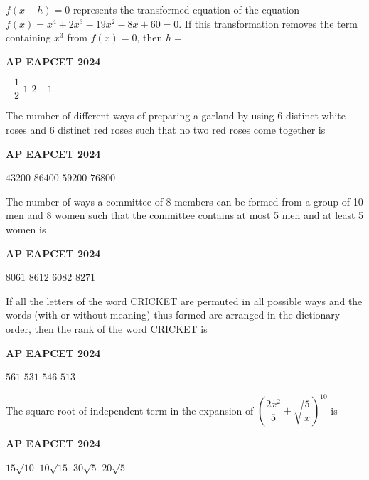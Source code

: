 \documentclass[11pt,paper=a4,answers]{exam}
\begin{document}
\begin{multicols}{2}
\begin{questions}
\question
$f(x+h)=0$ represents the transformed equation of the equation
$f(x)=x^4+2 x^3-19 x^2-8 x+60=0$. If this transformation removes the term containing $x^3$ from $f(x)=0$, then $h=$
\begin{flushright}
\small\textbf{AP EAPCET 2024}
\end{flushright}
\begin{choices}
  \choice $-\dfrac{1}{2}$ 
  \choice $1$ 
  \choice $2$ 
  \choice $-1$ 
\end{choices}



\question
The number of different ways of preparing a garland by using 6 distinct white roses and 6 distinct red roses such that no two red roses come together is
\begin{flushright}
\small\textbf{AP EAPCET 2024}
\end{flushright}
\begin{choices}
  \choice $43200$ 
  \choice $86400$ 
  \choice $59200$ 
  \choice $76800$ 
\end{choices}

\question
The number of ways a committee of 8 members can be formed from a group of 10 men and 8 women such that the committee contains at most 5 men and at least 5 women is
\begin{flushright}
\small\textbf{AP EAPCET 2024}
\end{flushright}
\begin{choices}
  \choice $8061$ 
  \choice $8612$ 
  \choice $6082$ 
  \choice $8271$ 
\end{choices}

\question
If all the letters of the word CRICKET are permuted in all possible ways and the words (with or without meaning) thus formed are arranged in the dictionary order, then the rank of the word CRICKET is
\begin{flushright}
\small\textbf{AP EAPCET 2024}
\end{flushright}
\begin{choices}
  \choice $561$ 
  \choice $531$ 
  \choice $546$ 
  \choice $513$ 
\end{choices}


\question
The square root of independent term in the expansion of $\left(\dfrac{2 x^2}{5}+\sqrt{\dfrac{5}{x}}\right)^{10}$ is
\begin{flushright}
\small\textbf{AP EAPCET 2024}
\end{flushright}
\begin{choices}
  \choice $15 \sqrt{10}$
  \choice $10 \sqrt{15}$
  \choice $30 \sqrt{5}$
  \choice $20 \sqrt{5}$
\end{choices}



\end{questions}
\end{multicols}
\end{document}
